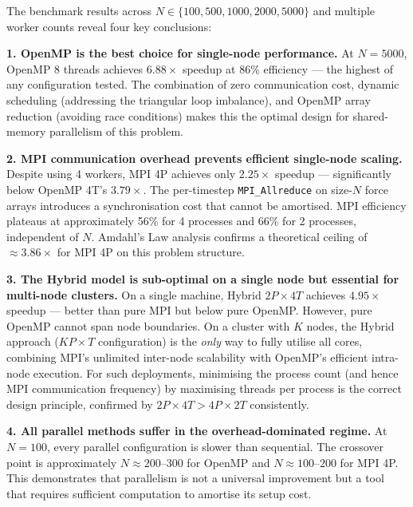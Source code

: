 ﻿\documentclass[12pt,a4paper]{article}
\begin{document}
The benchmark results across $N \in \{100, 500, 1000, 2000, 5000\}$ and
multiple worker counts reveal four key conclusions:

\textbf{1. OpenMP is the best choice for single-node performance.}
At $N=5000$, OpenMP 8 threads achieves $6.88\times$ speedup at 86\%
efficiency --- the highest of any configuration tested. The combination of
zero communication cost, dynamic scheduling (addressing the triangular loop
imbalance), and OpenMP array reduction (avoiding race conditions) makes this
the optimal design for shared-memory parallelism of this problem.

\textbf{2. MPI communication overhead prevents efficient single-node scaling.}
Despite using 4 workers, MPI 4P achieves only $2.25\times$ speedup ---
significantly below OpenMP 4T's $3.79\times$. The per-timestep
\texttt{MPI\_Allreduce} on size-$N$ force arrays introduces a synchronisation
cost that cannot be amortised. MPI efficiency plateaus at approximately
56\% for 4 processes and 66\% for 2 processes, independent of $N$.
Amdahl's Law analysis confirms a theoretical ceiling of $\approx 3.86\times$
for MPI 4P on this problem structure.

\textbf{3. The Hybrid model is sub-optimal on a single node but essential
for multi-node clusters.}
On a single machine, Hybrid $2P\times4T$ achieves $4.95\times$ speedup ---
better than pure MPI but below pure OpenMP. However, pure OpenMP cannot
span node boundaries. On a cluster with $K$ nodes, the Hybrid approach
($KP \times T$ configuration) is the \emph{only} way to fully utilise all
cores, combining MPI's unlimited inter-node scalability with OpenMP's
efficient intra-node execution. For such deployments, minimising the process
count (and hence MPI communication frequency) by maximising threads per
process is the correct design principle, confirmed by $2P\times4T >
4P\times2T$ consistently.

\textbf{4. All parallel methods suffer in the overhead-dominated regime.}
At $N=100$, every parallel configuration is slower than sequential. The
crossover point is approximately $N \approx 200$--$300$ for OpenMP and
$N \approx 100$--$200$ for MPI 4P. This demonstrates that parallelism is
not a universal improvement but a tool that requires sufficient computation
to amortise its setup cost.
\end{document}
